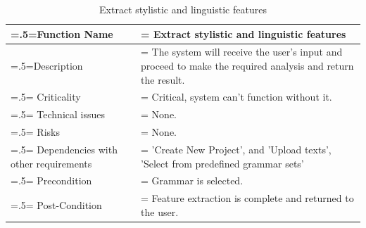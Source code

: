 \documentclass[12pt]{article}
\begin{document}
\begin{center}
    \begin{table}[H]
        \caption{Extract stylistic and linguistic features}
        \begin{tabularx}{\textwidth} {
                | >{\raggedright\arraybackslash\hsize=.5\hsize\linewidth=\hsize}X
                | >{\raggedright\arraybackslash\hsize=1.5\hsize\linewidth=\hsize}X |}
            \hline
            Function Name                        & Extract stylistic and linguistic features                                                                 \\ \hline
            Description                          & The system will receive the user's input and proceed to make the required analysis and return the result. \\ \hline
            Criticality                          & Critical, system can't function without it.                                                               \\ \hline
            Technical issues                     & None.                                                                                                     \\ \hline
            Risks                                & None.                                                                                                     \\ \hline
            Dependencies with other requirements & 'Create New Project', and 'Upload texts', 'Select from predefined grammar sets'                           \\ \hline
            Precondition                         & Grammar is selected.                                                                                      \\ \hline
            Post-Condition                       & Feature extraction is complete and returned to the user.                                                  \\ \hline
        \end{tabularx}
    \end{table}
\end{center}
\end{document}
